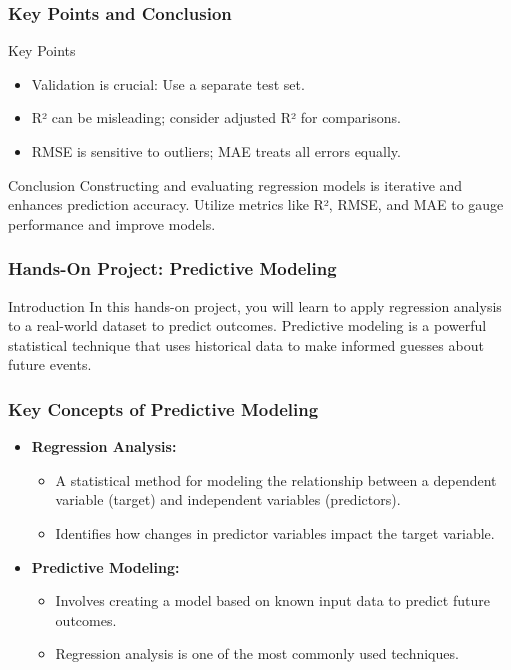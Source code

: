 \documentclass{beamer}
\begin{document}
\begin{frame}
    \frametitle{Key Points and Conclusion}
    \begin{block}{Key Points}
        \begin{itemize}
            \item Validation is crucial: Use a separate test set.
            \item R² can be misleading; consider adjusted R² for comparisons.
            \item RMSE is sensitive to outliers; MAE treats all errors equally.
        \end{itemize}
    \end{block}
    \begin{block}{Conclusion}
        Constructing and evaluating regression models is iterative and enhances prediction accuracy. Utilize metrics like R², RMSE, and MAE to gauge performance and improve models.
    \end{block}
\end{frame}

\begin{frame}
    \frametitle{Hands-On Project: Predictive Modeling}
    \begin{block}{Introduction}
        In this hands-on project, you will learn to apply regression analysis to a real-world dataset to predict outcomes. Predictive modeling is a powerful statistical technique that uses historical data to make informed guesses about future events.
    \end{block}
\end{frame}

\begin{frame}
    \frametitle{Key Concepts of Predictive Modeling}
    \begin{itemize}
        \item \textbf{Regression Analysis:} 
        \begin{itemize}
            \item A statistical method for modeling the relationship between a dependent variable (target) and independent variables (predictors).
            \item Identifies how changes in predictor variables impact the target variable.
        \end{itemize}
        \item \textbf{Predictive Modeling:} 
        \begin{itemize}
            \item Involves creating a model based on known input data to predict future outcomes.
            \item Regression analysis is one of the most commonly used techniques.
        \end{itemize}
    \end{itemize}
\end{frame}
\end{document}
